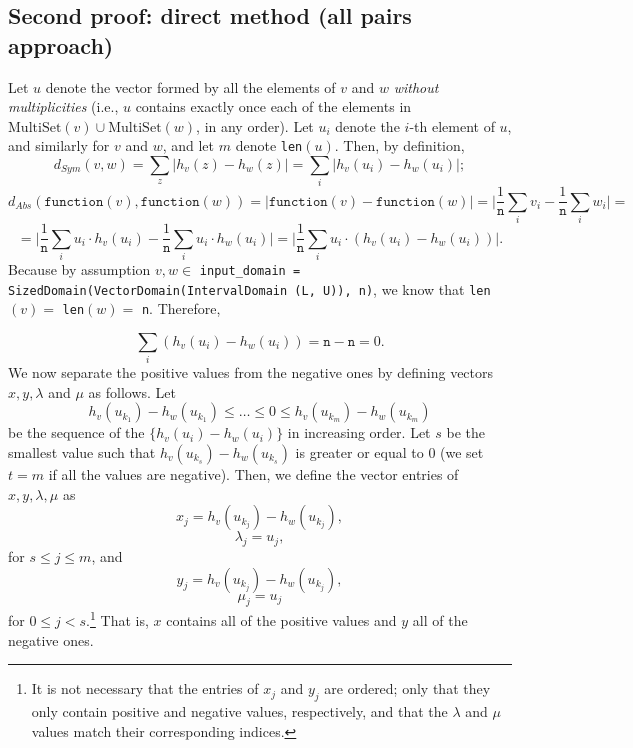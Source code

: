 \documentclass[11pt,a4paper]{article}
\theoremstyle{definition}
\newcommand{\MultiSet}{\mathrm{MultiSet}}
\newcommand{\function}{\texttt{function}}
\begin{document}
\newpage

\subsection{Second proof: direct method (all pairs approach)}
Let $u$ denote the vector formed by all the elements of $v$ and $w$ \textit{without multiplicities} (i.e., $u$ contains exactly once each of the elements in $\MultiSet(v) \cup \MultiSet(w)$, in any order). Let $u_i$ denote the $i$-th element of $u$, and similarly for $v$ and $w$, and let $m$ denote \texttt{len}$(u)$.  
Then, by definition,
\[
    d_{Sym}(v, w) = \sum_z \Big|h_v(z) - h_w(z)\Big| = \sum_i \Big|h_v(u_i) - h_w(u_i)\Big|;
\]
\[
    d_{Abs}(\function(v), \function(w)) = \Big|\function(v) - \function(w)\Big| = \Big|\dfrac{1}{\texttt{n}}\sum_i v_i - \dfrac{1}{\texttt{n}}\sum_i w_i\Big| = 
\]
\[
   = \Big|\dfrac{1}{\texttt{n}}\sum_i u_i \cdot h_v(u_i) - \dfrac{1}{\texttt{n}}\sum_i u_i \cdot h_w(u_i)\Big| = \Big|\dfrac{1}{\texttt{n}}\sum_i u_i \cdot (h_v(u_i) - h_w(u_i))\Big|.
\]
Because by assumption $v, w \in $ \texttt{input\_domain = SizedDomain(VectorDomain(IntervalDomain (L, U)), n)}, we know that \texttt{len}$(v) =$ \texttt{len}$(w) =$ \texttt{n}. Therefore,

\begin{equation}\label{eq:sum}
    \sum_i (h_v(u_i) - h_w(u_i)) = \texttt{n}-\texttt{n} = 0.
\end{equation}
We now separate the positive values from the negative ones by defining vectors $x, y, \lambda$ and $\mu$ as follows. Let
\[
    h_v(u_{k_1})-h_w(u_{k_1}) \leq \ldots \leq 0 \leq h_v(u_{k_m})-h_w(u_{k_m}) 
\]
be the sequence of the $\{h_v(u_i)-h_w(u_{i})\}$ in increasing order. Let $s$ be the smallest value such that $h_v(u_{k_s})-h_w(u_{k_s})$ is greater or equal to 0 (we set $t=m$ if all the values are negative). Then, we define the vector entries of $x, y, \lambda, \mu$ as
\[
    x_j = h_v(u_{k_{j}})-h_w(u_{k_{j}}),
\]
\[
    \lambda_j = u_{j},
\]
for $s \leq j \leq m$, and
\[
    y_j = h_v(u_{k_{j}})-h_w(u_{k_{j}}),
\]
\[
    \mu_j = u_j
\]
for $0 \leq j < s$.\footnote{It is not necessary that the entries of $x_j$ and $y_j$ are ordered; only that they only contain positive and negative values, respectively, and that the $\lambda$ and $\mu$ values match their corresponding indices.} That is, $x$ contains all of the positive values and $y$ all of the negative ones.
\end{document}
